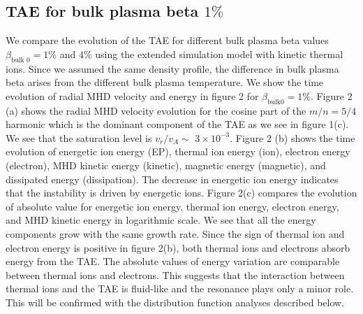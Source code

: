 \documentclass[10pt]{article}
\begin{document}
\subsection{TAE for bulk plasma beta $1 \%$}
We compare the evolution of the TAE for different bulk plasma beta values $\beta_{\text {bulk } 0}=1 \%$ and $4 \%$ using the extended simulation model with kinetic thermal ions. Since we assumed the same density profile, the difference in bulk plasma beta arises from the different bulk plasma temperature. We show the time evolution of radial MHD velocity and energy in figure 2 for $\beta_{\mathrm{bulk} 0}=1 \%$. Figure 2 (a) shows the radial $\mathrm{MHD}$ velocity evolution for the cosine part of the $m / n=5 / 4$ harmonic which is the dominant component of the TAE as we see in figure 1(c). We see that the saturation level is $v_{r} / v_{A} \sim$ $3 \times 10^{-3}$. Figure 2 (b) shows the time evolution of energetic ion energy (EP), thermal ion energy (ion), electron energy (electron), MHD kinetic energy (kinetic), magnetic energy (magnetic), and dissipated energy (dissipation). The decrease in energetic ion energy indicates that the instability is driven by energetic ions. Figure 2(c) compares the evolution of absolute value for energetic ion energy, thermal ion energy, electron energy, and MHD kinetic energy in logarithmic scale. We see that all the energy components grow with the same growth rate. Since the sign of thermal ion and electron energy is positive in figure 2(b), both thermal ions and electrons absorb energy from the TAE. The absolute values of energy variation are comparable between thermal ions and electrons. This suggests that the interaction between thermal ions and the TAE is fluid-like and the resonance plays only a minor role. This will be confirmed with the distribution function analyses described below.
\end{document}
